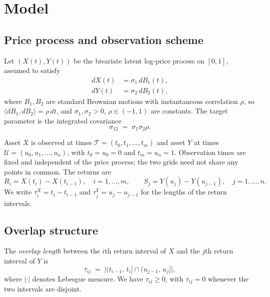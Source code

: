 
\section{Model}\label{sec:model}

\subsection{Price process and observation scheme}

Let $(X(t),Y(t))$ be the bivariate latent log-price process on $[0,1]$,
assumed to satisfy
\begin{align}\label{eq:bivariateBM}
  dX(t) &= \sigma_1\, dB_1(t), \nonumber \\
  dY(t) &= \sigma_2\, dB_2(t),
\end{align}
where $B_1,B_2$ are standard Brownian motions with instantaneous correlation
$\rho$, so $\langle dB_1, dB_2 \rangle = \rho\,dt$, and $\sigma_1,\sigma_2 > 0$,
$\rho \in (-1,1)$ are constants.  The target parameter is the integrated
covariance
\begin{equation}\label{eq:target}
  \sigma_{12} \;=\; \sigma_1 \sigma_2 \rho.
\end{equation}

Asset $X$ is observed at times $\mathcal{T} = (t_0, t_1, \ldots, t_m)$ and
asset $Y$ at times $\mathcal{U} = (u_0, u_1, \ldots, u_n)$, with
$t_0 = u_0 = 0$ and $t_m = u_n = 1$.  Observation times are fixed and
independent of the price process; the two grids need not share any points in
common.  The returns are
\begin{equation*}
  R_i = X(t_i) - X(t_{i-1}), \quad i = 1, \ldots, m, \qquad
  S_j = Y(u_j) - Y(u_{j-1}), \quad j = 1, \ldots, n.
\end{equation*}
We write $\tau_i^X = t_i - t_{i-1}$ and $\tau_j^Y = u_j - u_{j-1}$ for the
lengths of the return intervals.

\subsection{Overlap structure}

The \emph{overlap length} between the $i$th return interval of $X$ and the
$j$th return interval of $Y$ is
\begin{equation}\label{eq:overlap}
  \tau_{ij} \;=\; \bigl|(t_{i-1},\, t_i] \cap (u_{j-1},\, u_j]\bigr|,
\end{equation}
where $|\cdot|$ denotes Lebesgue measure.  We have $\tau_{ij} \geq 0$, with
$\tau_{ij} = 0$ whenever the two intervals are disjoint.


